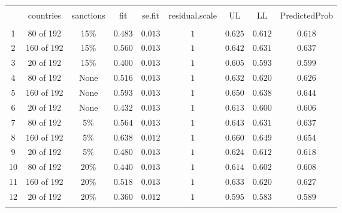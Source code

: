 
\begin{table}[!htbp] \centering 
  \caption{} 
  \label{tab:pred} 
\begin{tabular}{@{\extracolsep{5pt}} ccccccccc} 
\\[-1.8ex]\hline 
\hline \\[-1.8ex] 
 & countries & sanctions & fit & se.fit & residual.scale & UL & LL & PredictedProb \\ 
\hline \\[-1.8ex] 
1 & 80 of 192 & 15\% & $0.483$ & $0.013$ & $1$ & $0.625$ & $0.612$ & $0.618$ \\ 
2 & 160 of 192 & 15\% & $0.560$ & $0.013$ & $1$ & $0.642$ & $0.631$ & $0.637$ \\ 
3 & 20 of 192 & 15\% & $0.400$ & $0.013$ & $1$ & $0.605$ & $0.593$ & $0.599$ \\ 
4 & 80 of 192 & None & $0.516$ & $0.013$ & $1$ & $0.632$ & $0.620$ & $0.626$ \\ 
5 & 160 of 192 & None & $0.593$ & $0.013$ & $1$ & $0.650$ & $0.638$ & $0.644$ \\ 
6 & 20 of 192 & None & $0.432$ & $0.013$ & $1$ & $0.613$ & $0.600$ & $0.606$ \\ 
7 & 80 of 192 & 5\% & $0.564$ & $0.013$ & $1$ & $0.643$ & $0.631$ & $0.637$ \\ 
8 & 160 of 192 & 5\% & $0.638$ & $0.012$ & $1$ & $0.660$ & $0.649$ & $0.654$ \\ 
9 & 20 of 192 & 5\% & $0.480$ & $0.013$ & $1$ & $0.624$ & $0.612$ & $0.618$ \\ 
10 & 80 of 192 & 20\% & $0.440$ & $0.013$ & $1$ & $0.614$ & $0.602$ & $0.608$ \\ 
11 & 160 of 192 & 20\% & $0.518$ & $0.013$ & $1$ & $0.633$ & $0.620$ & $0.627$ \\ 
12 & 20 of 192 & 20\% & $0.360$ & $0.012$ & $1$ & $0.595$ & $0.583$ & $0.589$ \\ 
\hline \\[-1.8ex] 
\end{tabular} 
\end{table}  
